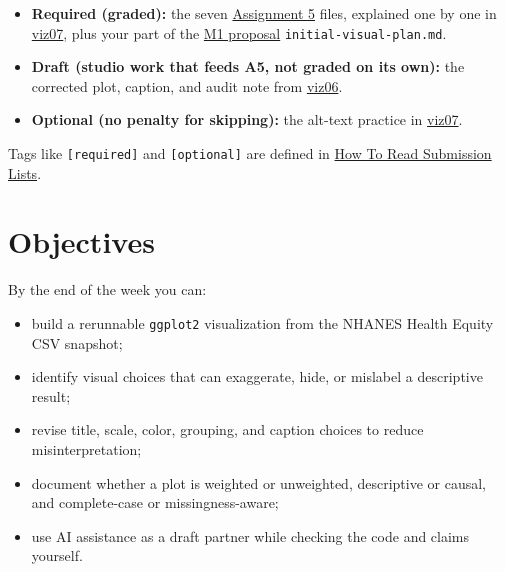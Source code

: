 \documentclass[
  letterpaper,
  DIV=11,
  numbers=noendperiod,
  oneside]{scrreprt}
\providecommand{\tightlist}{%
  \setlength{\itemsep}{0pt}\setlength{\parskip}{0pt}}
\begin{document}
\begin{tcolorbox}[enhanced jigsaw, title=\textcolor{quarto-callout-important-color}{\faExclamation}\hspace{0.5em}{Required / Draft / Optional This Week}, arc=.35mm, toptitle=1mm, colframe=quarto-callout-important-color-frame, toprule=.15mm, leftrule=.75mm, bottomtitle=1mm, opacityback=0, bottomrule=.15mm, coltitle=black, breakable, opacitybacktitle=0.6, titlerule=0mm, colback=white, left=2mm, colbacktitle=quarto-callout-important-color!10!white, rightrule=.15mm]

\begin{itemize}
\tightlist
\item
  \textbf{Required (graded):} the seven
  \href{../../assignments/assignment05-visualization/README.md}{Assignment
  5} files, explained one by one in
  \href{viz07-assignment-a5-and-reference.qmd}{viz07}, plus your part of
  the \href{../../milestones/m1-proposal/README.md}{M1 proposal}
  \texttt{initial-visual-plan.md}.
\item
  \textbf{Draft (studio work that feeds A5, not graded on its own):} the
  corrected plot, caption, and audit note from
  \href{viz06-studio-visual-audit.qmd}{viz06}.
\item
  \textbf{Optional (no penalty for skipping):} the alt-text practice in
  \href{viz07-assignment-a5-and-reference.qmd}{viz07}.
\end{itemize}

Tags like \texttt{{[}required{]}} and \texttt{{[}optional{]}} are
defined in \hyperref[how-to-read-submission-lists]{How To Read
Submission Lists}.

\end{tcolorbox}

\section*{Objectives}\label{objectives}


By the end of the week you can:

\begin{itemize}
\tightlist
\item
  build a rerunnable \texttt{ggplot2} visualization from the NHANES
  Health Equity CSV snapshot;
\item
  identify visual choices that can exaggerate, hide, or mislabel a
  descriptive result;
\item
  revise title, scale, color, grouping, and caption choices to reduce
  misinterpretation;
\item
  document whether a plot is weighted or unweighted, descriptive or
  causal, and complete-case or missingness-aware;
\item
  use AI assistance as a draft partner while checking the code and
  claims yourself.
\end{itemize}
\end{document}
